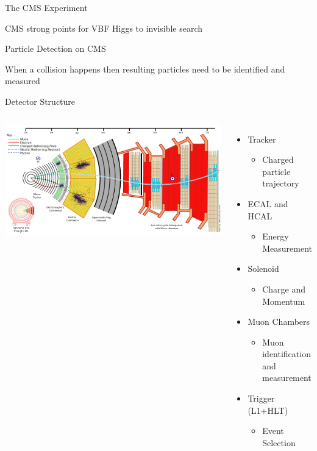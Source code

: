 \documentclass[8pt]{beamer}
\begin{document}
\begin{frame}{The CMS Experiment}
\begin{block}{CMS strong points for VBF Higgs to invisible search}
\end{block}

\end{frame}

\begin{frame}{Particle Detection on CMS}

When a collision happens then resulting particles need to be identified and measured
 
 \begin{block}{Detector Structure}

  \begin{columns}
    \column[t]{8.0cm}
 
      \begin{center}
        \includegraphics[width=1.00\textwidth]{img/CMS_Slice.png} 
      \end{center}  
      \column[t]{3.5cm}

       \begin{itemize}
         \item Tracker
         \begin{itemize}
           \item Charged particle trajectory
         \end{itemize}
         \item ECAL and HCAL
         \begin{itemize}
           \item Energy Measurement
         \end{itemize}
         \item Solenoid
         \begin{itemize}
           \item Charge and Momentum 
         \end{itemize} 
         \item Muon Chambers
         \begin{itemize}
           \item Muon identification and measurement 
         \end{itemize} 
         \item Trigger (L1+HLT)
         \begin{itemize}
           \item Event Selection 
         \end{itemize} 
       \end{itemize}


\end{columns}
\end{block}
\end{frame}
\end{document}
